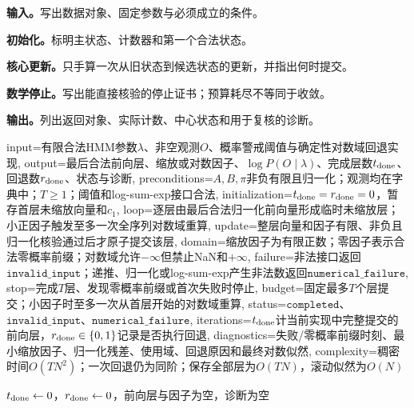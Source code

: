
\begin{keypointbox}[title={缩放前向算法：五步阅读}]
\textbf{输入。}写出数据对象、固定参数与必须成立的条件。\par
\textbf{初始化。}标明主状态、计数器和第一个合法状态。\par
\textbf{核心更新。}只手算一次从旧状态到候选状态的更新，并指出何时提交。\par
\textbf{数学停止。}写出能直接核验的停止证书；预算耗尽不等同于收敛。\par
\textbf{输出。}列出返回对象、实际计数、中心状态和用于复核的诊断。
\end{keypointbox}

\begin{AlgorithmContract}{
  input={有限合法HMM参数$\lambda$、非空观测$O$、概率警戒阈值与确定性对数域回退实现},
  output={最后合法前向层、缩放或对数因子、$\log P(O\mid\lambda)$、完成层数$t_{\rm done}$、回退数$r_{\rm done}$、状态与诊断},
  preconditions={$A,B,\pi$非负有限且归一化；观测均在字典中；$T\ge1$；阈值和log-sum-exp接口合法},
  initialization={$t_{\rm done}=r_{\rm done}=0$，暂存首层未缩放向量和$c_1$},
  loop={逐层由最后合法归一化前向量形成临时未缩放层；小正因子触发至多一次全序列对数域重算},
  update={整层向量和因子有限、非负且归一化核验通过后才原子提交该层},
  domain={缩放因子为有限正数；零因子表示合法零概率前缀；对数域允许$-\infty$但禁止NaN和$+\infty$},
  failure={非法接口返回$\mathtt{invalid\_input}$；递推、归一化或log-sum-exp产生非法数返回$\mathtt{numerical\_failure}$},
  stop={完成$T$层、发现零概率前缀或首次失败时停止},
  budget={固定最多$T$个层提交；小因子时至多一次从首层开始的对数域重算},
  status={$\mathtt{completed}$、$\mathtt{invalid\_input}$、$\mathtt{numerical\_failure}$},
  iterations={$t_{\rm done}$计当前实现中完整提交的前向层，$r_{\rm done}\in\{0,1\}$记录是否执行回退},
  diagnostics={失败/零概率前缀时刻、最小缩放因子、归一化残差、使用域、回退原因和最终对数似然},
  complexity={稠密时间$O(TN^2)$；一次回退仍为同阶；保存全部层为$O(TN)$，滚动似然为$O(N)$}
}
\begin{algorithm}[H]
\caption{缩放前向算法}\label{alg:V3-C05-forward-scaled}
$t_{\rm done}\leftarrow0$，$r_{\rm done}\leftarrow0$，前向层与因子为空，诊断为空\;

\end{algorithm}
\end{AlgorithmContract}
